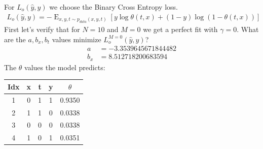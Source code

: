 \documentclass[oneside,12pt]{article}
\begin{document}
%
For $L_o(\hat{y}, y)$ we choose the Binary Cross Entropy loss.
%
\begin{equation}\label{eq:lossExample01}
    \begin{split}
        L_o(\hat{y}, y) = -\operatorname{E}_{x,y,t \sim p_{data}(x,y,t)}\left[y \operatorname{log}\theta(t,x) + (1-y)\operatorname{log}(1-\theta(t,x))\right]
    \end{split}
\end{equation}
%
%
%
First let's verify that for $N=10$ and $M=0$ we get a perfect fit with $\gamma=0$. What are the $a,b_x,b_t$ values minimize $L_o^{M=0}(\hat{y}, y)$?
\begin{equation}
    \begin{split}
        a &= -3.3539645671844482\\
        b_x &= 8.512718200683594
    \end{split}
\end{equation}
%
The $\theta$ values the model predicts:
%
\begin{center}
 \begin{tabular}{||c | c | c | c | c ||}
 \hline
 Idx & x & t & y & $\theta$ \\ [0.5ex] 
 \hline\hline
 1 & 0 & 1 & 1 & 0.9350 \\ 
 \hline
 2 & 1 & 1 & 0 & 0.0338 \\
 \hline
 3 & 0 & 0 & 0 & 0.0338 \\
 \hline
 4 & 1 & 0 & 1 & 0.0351 \\ [1ex] 
 \hline
\end{tabular}
\end{center}
\end{document}
